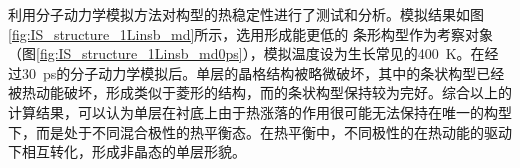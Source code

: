 利用分子动力学模拟方法对构型的热稳定性进行了测试和分析。模拟结果如图\ref{fig:IS_structure_1Linsb_md}所示，选用形成能更低的 条形构型作为考察对象（图\ref{fig:IS_structure_1Linsb_md0ps}），模拟温度设为生长常见的\SI{400}{\kelvin}。在经过\SI{30}{\pico\second}的分子动力学模拟后。单层的晶格结构被略微破坏，其中的条状构型已经被热动能破坏，形成类似于菱形的结构，而的条状构型保持较为完好。综合以上的计算结果，可以认为单层在衬底上由于热涨落的作用很可能无法保持在唯一的构型下，而是处于不同混合极性的热平衡态。在热平衡中，不同极性的在热动能的驱动下相互转化，形成非晶态的单层形貌。

\begin{figure}[htb]
    \\[-1ex]

\end{figure}
